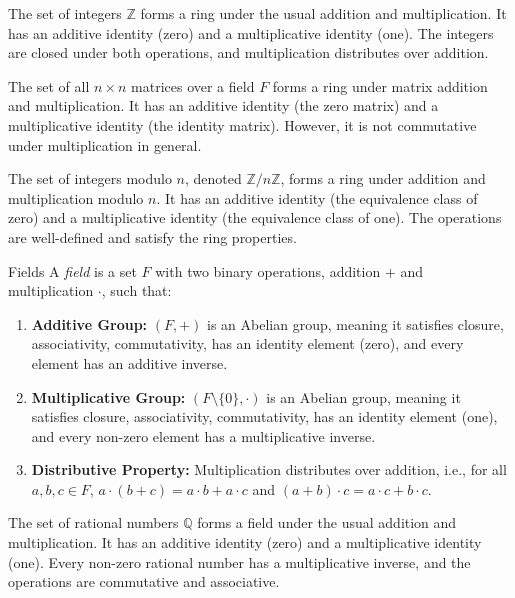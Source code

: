 \documentclass[openany]{book}
\begin{document}
\begin{example}
    The set of integers $\mathbb{Z}$ forms a ring under the usual addition and multiplication. It has an additive identity (zero) and a multiplicative identity (one). The integers are closed under both operations, and multiplication distributes over addition.
\end{example}
\begin{example}
    The set of all $n \times n$ matrices over a field $F$ forms a ring under matrix addition and multiplication. It has an additive identity (the zero matrix) and a multiplicative identity (the identity matrix). However, it is not commutative under multiplication in general.
\end{example}
\begin{example}
    The set of integers modulo $n$, denoted $\mathbb{Z}/n\mathbb{Z}$, forms a ring under addition and multiplication modulo $n$. It has an additive identity (the equivalence class of zero) and a multiplicative identity (the equivalence class of one). The operations are well-defined and satisfy the ring properties.
\end{example}
\begin{mydefinition}{Fields}
A \emph{field} is a set $F$ with two binary operations, addition $+$ and multiplication $\cdot$, such that:
\begin{enumerate}
    \item \textbf{Additive Group:} $(F, +)$ is an Abelian group, meaning it satisfies closure, associativity, commutativity, has an identity element (zero), and every element has an additive inverse.
    \item \textbf{Multiplicative Group:} $(F \setminus \{0\}, \cdot)$ is an Abelian group, meaning it satisfies closure, associativity, commutativity, has an identity element (one), and every non-zero element has a multiplicative inverse.
    \item \textbf{Distributive Property:} Multiplication distributes over addition, i.e., for all $a, b, c \in F$, $a \cdot (b + c) = a \cdot b + a \cdot c$ and $(a + b) \cdot c = a \cdot c + b \cdot c$.
\end{enumerate}
\end{mydefinition}
\begin{example}
    The set of rational numbers $\mathbb{Q}$ forms a field under the usual addition and multiplication. It has an additive identity (zero) and a multiplicative identity (one). Every non-zero rational number has a multiplicative inverse, and the operations are commutative and associative.
\end{example}
\end{document}

